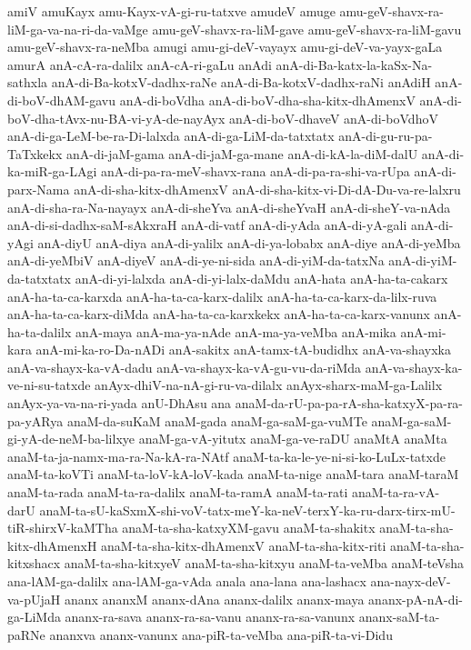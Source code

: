 {amiV
amuKayx
amu-Kayx-vA-gi-ru-tatxve
amudeV
amuge
amu-geV-shavx-ra-liM-ga-va-na-ri-da-vaMge
amu-geV-shavx-ra-liM-gave
amu-geV-shavx-ra-liM-gavu
amu-geV-shavx-ra-neMba
amugi
amu-gi-deV-vayayx
amu-gi-deV-va-yayx-gaLa
amurA
anA-cA-ra-dalilx
anA-cA-ri-gaLu
anAdi
anA-di-Ba-katx-la-kaSx-Na-sathxla
anA-di-Ba-kotxV-dadhx-raNe
anA-di-Ba-kotxV-dadhx-raNi
anAdiH
anA-di-boV-dhAM-gavu
anA-di-boVdha
anA-di-boV-dha-sha-kitx-dhAmenxV
anA-di-boV-dha-tAvx-nu-BA-vi-yA-de-nayAyx
anA-di-boV-dhaveV
anA-di-boVdhoV
anA-di-ga-LeM-be-ra-Di-lalxda
anA-di-ga-LiM-da-tatxtatx
anA-di-gu-ru-pa-TaTxkekx
anA-di-jaM-gama
anA-di-jaM-ga-mane
anA-di-kA-la-diM-dalU
anA-di-ka-miR-ga-LAgi
anA-di-pa-ra-meV-shavx-rana
anA-di-pa-ra-shi-va-rUpa
anA-di-parx-Nama
anA-di-sha-kitx-dhAmenxV
anA-di-sha-kitx-vi-Di-dA-Du-va-re-lalxru
anA-di-sha-ra-Na-nayayx
anA-di-sheYva
anA-di-sheYvaH
anA-di-sheY-va-nAda
anA-di-si-dadhx-saM-sAkxraH
anA-di-vatf
anA-di-yAda
anA-di-yA-gali
anA-di-yAgi
anA-diyU
anA-diya
anA-di-yalilx
anA-di-ya-lobabx
anA-diye
anA-di-yeMba
anA-di-yeMbiV
anA-diyeV
anA-di-ye-ni-sida
anA-di-yiM-da-tatxNa
anA-di-yiM-da-tatxtatx
anA-di-yi-lalxda
anA-di-yi-lalx-daMdu
anA-hata
anA-ha-ta-cakarx
anA-ha-ta-ca-karxda
anA-ha-ta-ca-karx-dalilx
anA-ha-ta-ca-karx-da-lilx-ruva
anA-ha-ta-ca-karx-diMda
anA-ha-ta-ca-karxkekx
anA-ha-ta-ca-karx-vanunx
anA-ha-ta-dalilx
anA-maya
anA-ma-ya-nAde
anA-ma-ya-veMba
anA-mika
anA-mi-kara
anA-mi-ka-ro-Da-nADi
anA-sakitx
anA-tamx-tA-budidhx
anA-va-shayxka
anA-va-shayx-ka-vA-dadu
anA-va-shayx-ka-vA-gu-vu-da-riMda
anA-va-shayx-ka-ve-ni-su-tatxde
anAyx-dhiV-na-nA-gi-ru-va-dilalx
anAyx-sharx-maM-ga-Lalilx
anAyx-ya-va-na-ri-yada
anU-DhAsu
ana
anaM-da-rU-pa-pa-rA-sha-katxyX-pa-ra-pa-yARya
anaM-da-suKaM
anaM-gada
anaM-ga-saM-ga-vuMTe
anaM-ga-saM-gi-yA-de-neM-ba-lilxye
anaM-ga-vA-yitutx
anaM-ga-ve-raDU
anaMtA
anaMta
anaM-ta-ja-namx-ma-ra-Na-kA-ra-NAtf
anaM-ta-ka-le-ye-ni-si-ko-LuLx-tatxde
anaM-ta-koVTi
anaM-ta-loV-kA-loV-kada
anaM-ta-nige
anaM-tara
anaM-taraM
anaM-ta-rada
anaM-ta-ra-dalilx
anaM-ta-ramA
anaM-ta-rati
anaM-ta-ra-vA-darU
anaM-ta-sU-kaSxmX-shi-voV-tatx-meY-ka-neV-terxY-ka-ru-darx-tirx-mU-tiR-shirxV-kaMTha
anaM-ta-sha-katxyXM-gavu
anaM-ta-shakitx
anaM-ta-sha-kitx-dhAmenxH
anaM-ta-sha-kitx-dhAmenxV
anaM-ta-sha-kitx-riti
anaM-ta-sha-kitxshacx
anaM-ta-sha-kitxyeV
anaM-ta-sha-kitxyu
anaM-ta-veMba
anaM-teVsha
ana-lAM-ga-dalilx
ana-lAM-ga-vAda
anala
ana-lana
ana-lashacx
ana-nayx-deV-va-pUjaH
ananx
ananxM
ananx-dAna
ananx-dalilx
ananx-maya
ananx-pA-nA-di-ga-LiMda
ananx-ra-sava
ananx-ra-sa-vanu
ananx-ra-sa-vanunx
ananx-saM-ta-paRNe
ananxva
ananx-vanunx
ana-piR-ta-veMba
ana-piR-ta-vi-Didu
}
